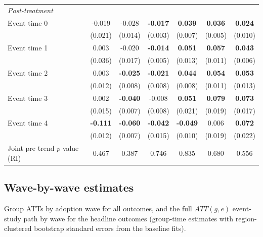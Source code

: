 \documentclass[
]{article}
\begin{document}
\begin{table}[htbp]
{{\begin{tabular}{lcccccc}
      \multicolumn{7}{l}{\textit{Post-treatment}}\\
      Event time 0 & -0.019 & -0.028 & \textbf{-0.017} & \textbf{0.039} & \textbf{0.036} & \textbf{0.024}\\
       & (0.021) & (0.014) & (0.003) & (0.007) & (0.005) & (0.010)\\
      Event time 1 & 0.003 & -0.020 & \textbf{-0.014} & \textbf{0.051} & \textbf{0.057} & \textbf{0.043}\\
       & (0.036) & (0.017) & (0.005) & (0.013) & (0.011) & (0.006)\\
      Event time 2 & 0.003 & \textbf{-0.025} & \textbf{-0.021} & \textbf{0.044} & \textbf{0.054} & \textbf{0.053}\\
       & (0.012) & (0.008) & (0.008) & (0.008) & (0.011) & (0.013)\\
      Event time 3 & 0.002 & \textbf{-0.040} & -0.008 & \textbf{0.051} & \textbf{0.079} & \textbf{0.073}\\
       & (0.015) & (0.007) & (0.008) & (0.021) & (0.019) & (0.017)\\
      Event time 4 & \textbf{-0.111} & \textbf{-0.060} & \textbf{-0.042} & \textbf{-0.049} & 0.006 & \textbf{0.072}\\
       & (0.012) & (0.007) & (0.015) & (0.010) & (0.019) & (0.022)\\
      \midrule
      Joint pre-trend $p$-value (RI) & 0.467 & 0.387 & 0.746 & 0.835 & 0.680 & 0.556\\
      \bottomrule
   \end{tabular}}}
\end{table}

\hypertarget{wave-by-wave-estimates}{%
\subsection{Wave-by-wave estimates}\label{wave-by-wave-estimates}}

Group ATTs by adoption wave for all outcomes, and the full \(ATT(g,e)\)
event-study path by wave for the headline outcomes (group-time estimates
with region-clustered bootstrap standard errors from the baseline fits).
\end{document}
